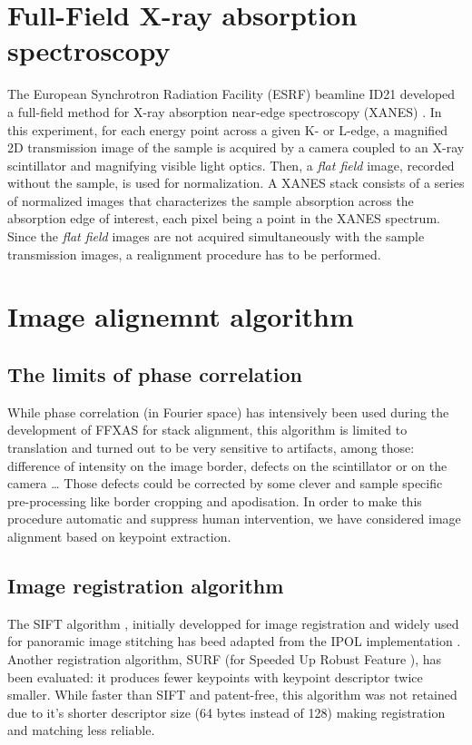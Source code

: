 \documentclass[preprint]{iucr}
\begin{document}
\section{Full-Field X-ray absorption spectroscopy}
The European Synchrotron Radiation Facility (ESRF) beamline ID21 developed a
full-field method for X-ray absorption near-edge spectroscopy
(XANES) \cite{fullfield}. 
In this experiment, for each energy point across a given K- or L-edge,
a magnified 2D transmission image of the sample is acquired by a camera coupled
to an X-ray scintillator and magnifying visible light optics.
Then, a \emph{flat field} image, recorded without the sample, is used for
normalization. 
A XANES stack consists of a series of normalized images that characterizes the
sample absorption across the absorption edge of interest, each pixel being a
point in the XANES spectrum.
Since the \emph{flat field} images are not acquired simultaneously with the
sample transmission images, a realignment procedure has to be performed.


\section{Image alignemnt algorithm}

\subsection{The limits of phase correlation}

While phase correlation (in Fourier space) has intensively been used during the
development of FFXAS for stack alignment, this algorithm is limited to
translation and turned out to be very sensitive to artifacts, among those:
difference of intensity on  the image border, defects on the scintillator or on
the camera \ldots
Those defects could be corrected by some clever and sample
specific pre-processing like border cropping and apodisation. 
In order to make this procedure automatic and suppress human intervention, we
have considered image alignment based on keypoint extraction.

\subsection{Image registration algorithm}

The SIFT algorithm \cite{Lowe99,Lowe04}, initially developped
for image registration and widely used for panoramic image stitching has beed
adapted from the IPOL implementation \cite{ASIFT}.
Another registration algorithm, SURF (for Speeded Up Robust Feature
\cite{surf}), has been evaluated: it produces fewer keypoints with keypoint descriptor twice
smaller. 
While faster than SIFT and patent-free, this algorithm was not
retained due to it's shorter descriptor size (64 bytes instead of 128) making 
registration and matching less reliable.
\end{document}
